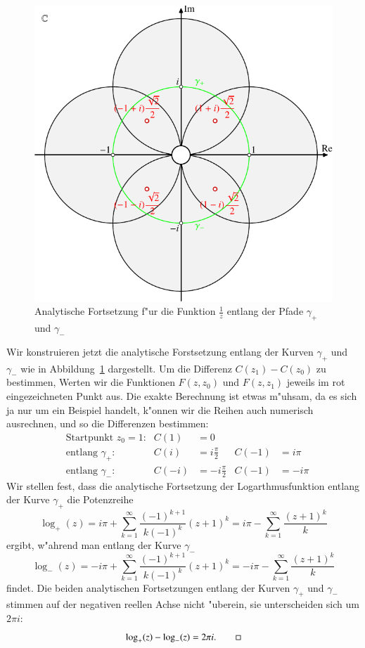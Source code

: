 \begin{beispiel}
\begin{figure}
\centering
\includegraphics{chapters/images/komplex-2.pdf}
\caption{Analytische Fortsetzung f"ur die Funktion $\frac1z$ 
entlang der Pfade $\gamma_+$ und $\gamma_-$
\label{komplex:logfortsetzung}}
\end{figure}
Wir konstruieren jetzt die analytische Forstsetzung entlang der Kurven
$\gamma_+$ und $\gamma_-$ wie in Abbildung~\ref{komplex:logfortsetzung}
dargestellt.
Um die Differenz $C(z_1)-C(z_0)$ zu bestimmen, Werten wir die Funktionen
$F(z,z_0)$ und $F(z,z_1)$ jeweils im rot eingezeichneten Punkt aus.
Die exakte Berechnung ist etwas m"uhsam, da es sich ja nur um ein Beispiel
handelt, k"onnen wir die Reihen auch numerisch ausrechnen, und so die
Differenzen bestimmen:
\begin{align*}
&\text{Startpunkt $z_0=1$:}& C(1)&=0             &       &       \\
&\text{entlang $\gamma_+$:}& C(i)&= i\frac{\pi}2 & C(-1) &=  i\pi\\
&\text{entlang $\gamma_-$:}&C(-i)&=-i\frac{\pi}2 & C(-1) &= -i\pi
\end{align*}
Wir stellen fest, dass die analytische Fortsetzung der Logarthmusfunktion
entlang der Kurve $\gamma_+$ die Potenzreihe
\[
\log_+(z)
=
i\pi +\sum_{k=1}^\infty \frac{(-1)^{k+1}}{k(-1)^k}(z+1)^k
=
i\pi
-
\sum_{k=1}^\infty \frac{(z+1)^k}{k}
\]
ergibt, w"ahrend man entlang der  Kurve $\gamma_-$
\[
\log_-(z)
=
-i\pi +\sum_{k=1}^\infty \frac{(-1)^{k+1}}{k(-1)^k}(z+1)^k
=
-i\pi
-
\sum_{k=1}^\infty \frac{(z+1)^k}{k}
\]
findet.
Die beiden analytischen Fortsetzungen entlang der Kurven $\gamma_+$ und
$\gamma_-$ stimmen auf der negativen reellen Achse nicht "uberein,
sie unterscheiden sich um $2\pi i$:
\[
\log_+(z)-\log_-(z)=2\pi i.
\qedhere
\]
\end{beispiel}

